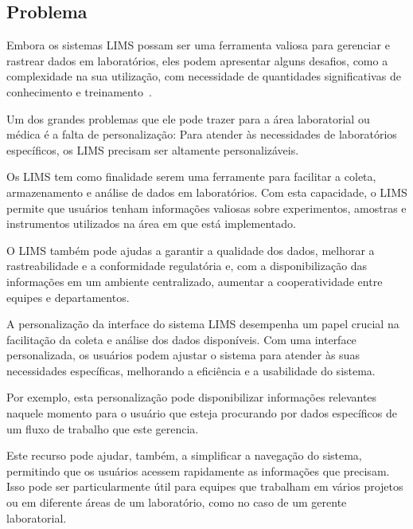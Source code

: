\subsection{Problema}

Embora os sistemas LIMS possam ser uma ferramenta valiosa para gerenciar e rastrear dados em laboratórios, eles podem apresentar alguns desafios, como a complexidade na sua utilização, com necessidade de quantidades significativas de conhecimento e treinamento~\cite{Avery2000ProductGuide.}.

Um dos grandes problemas que ele pode trazer para a área laboratorial ou médica é a falta de personalização: Para atender às necessidades de laboratórios específicos, os LIMS precisam ser altamente personalizáveis.

Os LIMS tem como finalidade serem uma ferramente para facilitar a coleta, armazenamento e análise de dados em laboratórios. Com esta capacidade, o LIMS permite que usuários tenham informações valiosas sobre experimentos, amostras e instrumentos utilizados na área em que está implementado.

O LIMS também pode ajudas a garantir a qualidade dos dados, melhorar a rastreabilidade e a conformidade regulatória e, com a disponibilização das informações em um ambiente centralizado, aumentar a cooperatividade entre equipes e departamentos.

A personalização da interface do sistema LIMS desempenha um papel crucial na facilitação da coleta e análise dos dados disponíveis. Com uma interface personalizada, os usuários podem ajustar o sistema para atender às suas necessidades específicas, melhorando a eficiência e a usabilidade do sistema.

Por exemplo, esta personalização pode disponibilizar informações relevantes naquele momento para o usuário que esteja procurando por dados específicos de um fluxo de trabalho que este gerencia.

Este recurso pode ajudar, também, a simplificar a navegação do sistema, permitindo que os usuários acessem rapidamente as informações que precisam. Isso pode ser particularmente útil para equipes que trabalham em vários projetos ou em diferente áreas de um laboratório, como no caso de um gerente laboratorial.